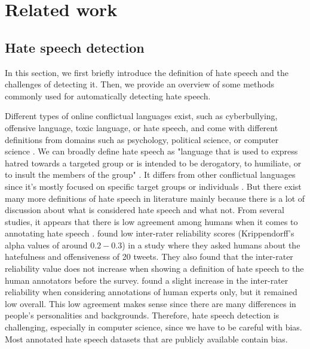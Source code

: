 \chapter{Related work}

\section{Hate speech detection}
In this section, we first briefly introduce the definition of hate speech and the challenges of detecting it. Then, we provide an overview of some methods commonly used for automatically detecting hate speech.

Different types of online conflictual languages exist, such as cyberbullying, offensive language, toxic language, or hate speech, and come with different definitions from domains such as psychology, political science, or computer science \cite{balayn2021automatic}.
%
We can broadly define hate speech as "language that is used to express hatred towards a targeted group or is intended to be derogatory, to humiliate, or to insult the members of the group" \cite{davidson2017automated, balayn2021automatic}.
%
It differs from other conflictual languages since it's mostly focused on specific target groups or individuals \cite{balayn2021automatic}.
%
But there exist many more definitions of hate speech in literature mainly because there is a lot of discussion about what is considered hate speech and what not.
%
From several studies, it appears that there is low agreement among humans when it comes to annotating hate speech \cite{fortuna2018survey, ross2017measuring, waseem2016you}.
%
\citet{ross2017measuring} found low inter-rater reliability scores (Krippendorff's alpha values of around $0.2-0.3$) in a study where they asked humans about the hatefulness and offensiveness of 20 tweets.
%
They also found that the inter-rater reliability value does not increase when showing a definition of hate speech to the human annotators before the survey.
%
\citet{waseem2016you} found a slight increase in the inter-rater reliability when considering annotations of human experts only, but it remained low overall.
%
This low agreement makes sense since there are many differences in people's personalities and backgrounds.
%
Therefore, hate speech detection is challenging, especially in computer science, since we have to be careful with bias.
%
Most annotated hate speech datasets that are publicly available contain bias.
